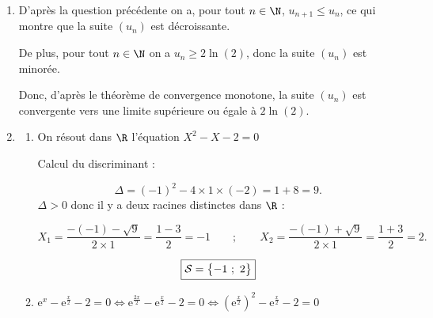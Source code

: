 \begin{enumerate}

	\item D'après la question précédente on a, pour tout $n \in \N$, $u_{n+1} \leqslant u_{n}$, ce qui montre que la suite $\left(u_{n}\right)$ est décroissante.

De plus, pour tout $n \in \N$ on a $u_{n} \geqslant 2\ln(2)$, donc la suite $\left(u_{n}\right)$ est minorée.
	
Donc, d'après le théorème de convergence monotone, la suite $\left(u_{n}\right)$ est convergente vers une limite supérieure ou égale à $2\ln(2)$.
	\item
	\begin{enumerate}
		\item On résout dans $\R$ l'équation $X^{2} - X - 2 = 0$

Calcul du discriminant :

\[\Delta = (-1)^{2} - 4 \times 1 \times (-2) = 1 + 8 = \boxed{9}.\]
$\Delta > 0$ donc il y a deux racines distinctes dans $\R$ :

\[X_{1} = \dfrac{-(-1) - \sqrt{9}}{2 \times 1} = \dfrac{1-3}{2} = -1 \qquad ; \qquad X_{2} = \dfrac{-(-1) + \sqrt{9}}{2 \times 1} = \dfrac{1+3}{2} = 2.\]

		\[\boxed{\mathcal{S} = \left\{-1~;~2 \strut\right\}}\]

		\item \quad $\text{e}^{x} - \text{e}^{\frac{x}{2}} - 2 = 0 \iff \text{e}^{\frac{2x}{2}} - \text{e}^{\frac{x}{2}} - 2 = 0 \iff \left(\text{e}^{\frac{x}{2}}\right)^{2} - \text{e}^{\frac{x}{2}} - 2 = 0$


\end{enumerate}
\end{enumerate}
